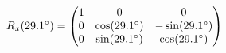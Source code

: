 \documentclass[preview]{standalone}
\begin{document}
\begin{align*}
\special{dvisvgm:raw <g id='unique000'>}R_x(29.1^\circ) = \begin{pmatrix} 1 & 0 & 0 \\ 0 & \cos(29.1^\circ) & -\sin(29.1^\circ) \\ 0 & \sin(29.1^\circ) & \cos(29.1^\circ) \end{pmatrix}\special{dvisvgm:raw </g>}
\end{align*}
\end{document}
